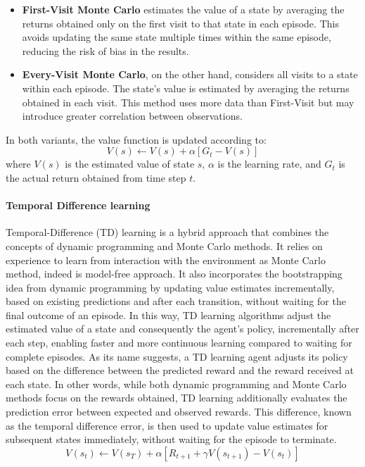 \documentclass[12pt,a4paper]{report}
\begin{document}
\begin{itemize}
    \item \textbf{First-Visit Monte Carlo} estimates the value of a state by averaging 
    the returns obtained only on the first visit to that state in each episode. This 
    avoids updating the same state multiple times within the same episode, reducing 
    the risk of bias in the results.

    \item \textbf{Every-Visit Monte Carlo}, on the other hand, considers all visits 
    to a state within each episode. The state's value is estimated by averaging the 
    returns obtained in each visit. This method uses more data than First-Visit but 
    may introduce greater correlation between observations.
\end{itemize}
In both variants, the value function is updated according to:
\[
V(s) \leftarrow V(s) + \alpha \left[ G_t - V(s) \right]
\]
where $V(s)$ is the estimated value of state $s$, $\alpha$ is the learning rate, 
and $G_t$ is the actual return obtained from time step $t$.

\paragraph{Temporal Difference learning}

Temporal-Difference (TD) learning is a hybrid approach that combines the concepts of dynamic programming and Monte Carlo methods. It relies on experience to learn from interaction with the environment as Monte Carlo method, indeed is model-free approach. It also incorporates the bootstrapping idea from dynamic programming by updating value estimates incrementally, based on existing predictions and after each transition, without waiting for the final outcome of an episode. In this way, TD learning algorithms adjust the estimated value of a state and consequently the agent's policy, incrementally after each step, enabling faster and more continuous learning compared to waiting for complete episodes.
As its name suggests, a TD learning agent adjusts its policy based on the difference between the predicted reward and the reward received at each state. In other words, while both dynamic programming and Monte Carlo methods focus on the rewards obtained, TD learning additionally evaluates the prediction error between expected and observed rewards. This difference, known as the temporal difference error, is then used to update value estimates for subsequent states immediately, without waiting for the episode to terminate.
\[
V(s_t) \leftarrow V(s_T) + \alpha\left[R_{t+1} + \gamma V(s_{t+1}) - V(s_t)\right]
\]
\end{document}
